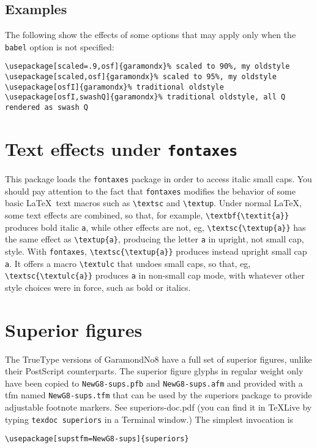 \documentclass[11pt]{article}
\begin{document}
\subsection{Examples} The following show the effects of some options that may apply only when the {\tt babel} option is not specified:

\begin{verbatim}
\usepackage[scaled=.9,osf]{garamondx}% scaled to 90%, my oldstyle
\usepackage[scaled,osf]{garamondx}% scaled to 95%, my oldstyle
\usepackage[osfI]{garamondx}% traditional oldstyle
\usepackage[osfI,swashQ]{garamondx}% traditional oldstyle, all Q rendered as swash Q
\end{verbatim}
\section{Text effects under \texttt{fontaxes}}
This package loads the {\tt fontaxes} package in order to access italic small caps. You should pay attention to the fact that {\tt fontaxes} modifies the behavior of some basic \LaTeX\ text macros such as \verb|\textsc| and \verb|\textup|. Under normal \LaTeX, some text effects are combined, so that, for example, \verb|\textbf{\textit{a}}| produces bold italic {\tt a}, while other effects are not, eg, \verb|\textsc{\textup{a}}| has the same effect as \verb|\textup{a}|, producing the letter {\tt a} in upright, not small cap, style. With {\tt fontaxes}, \verb|\textsc{\textup{a}}| produces instead upright small cap {\tt a}. It offers a macro \verb|\textulc| that undoes small caps, so that, eg, \verb|\textsc{\textulc{a}}| produces {\tt a} in non-small cap mode, with whatever other style choices were in force, such as bold or italics.

\section{Superior figures}
The TrueType versions of GaramondNo8 have a full set of superior figures, unlike their PostScript counterparts. The superior figure glyphs in regular weight only have been copied to \texttt{NewG8-sups.pfb} and \texttt{NewG8-sups.afm} and provided with a tfm named \texttt{NewG8-sups.tfm} that can be used by the \textsf{superiors} package to provide adjustable footnote markers. See \textsf{superiors-doc.pdf} (you can find it in \TeX Live by typing \texttt{texdoc superiors} in a Terminal window.) The simplest invocation is
\begin{verbatim}
\usepackage[supstfm=NewG8-sups]{superiors}
\end{verbatim}
\end{document}
